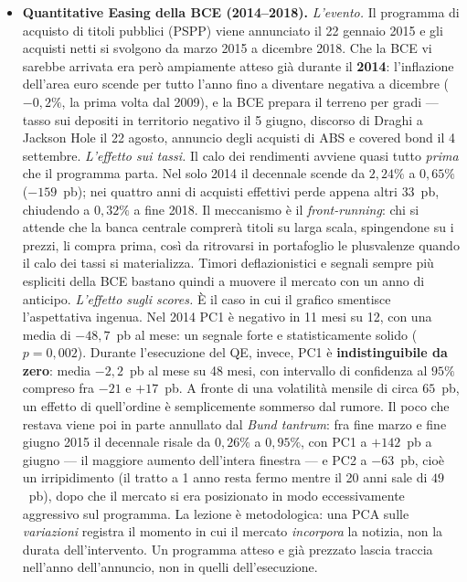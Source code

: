 \documentclass[11pt,a4paper]{article}
\theoremstyle{plain}
\theoremstyle{definition}
\theoremstyle{remark}
\begin{document}
\begin{itemize}
  \item \textbf{Quantitative Easing della BCE (2014--2018).}
        \emph{L'evento.} Il programma di acquisto di titoli pubblici (PSPP)
        viene annunciato il 22 gennaio 2015 e gli acquisti netti si svolgono
        da marzo 2015 a dicembre 2018. Che la BCE vi sarebbe arrivata era però
        ampiamente atteso già durante il \textbf{2014}: l'inflazione dell'area
        euro scende per tutto l'anno fino a diventare negativa a dicembre
        ($-0{,}2\%$, la prima volta dal 2009), e la BCE prepara il terreno per
        gradi --- tasso sui depositi in territorio negativo il 5 giugno,
        discorso di Draghi a Jackson Hole il 22 agosto, annuncio degli
        acquisti di ABS e covered bond il 4 settembre.
        \emph{L'effetto sui tassi.} Il calo dei rendimenti avviene quasi tutto
        \emph{prima} che il programma parta. Nel solo 2014 il decennale scende
        da $2{,}24\%$ a $0{,}65\%$ ($-159$~pb); nei quattro anni di acquisti
        effettivi perde appena altri $33$~pb, chiudendo a $0{,}32\%$ a fine
        2018. Il meccanismo è il \emph{front-running}: chi si attende che la
        banca centrale comprerà titoli su larga scala, spingendone su i
        prezzi, li compra prima, così da ritrovarsi in portafoglio le
        plusvalenze quando il calo dei tassi si materializza. Timori
        deflazionistici e segnali sempre più espliciti della BCE bastano
        quindi a muovere il mercato con un anno di anticipo.
        \emph{L'effetto sugli scores.} È il caso in cui il grafico smentisce
        l'aspettativa ingenua. Nel 2014 PC1 è negativo in 11 mesi su 12, con
        una media di $-48{,}7$~pb al mese: un segnale forte e statisticamente
        solido ($p = 0{,}002$). Durante l'esecuzione del QE, invece, PC1 è
        \textbf{indistinguibile da zero}: media $-2{,}2$~pb al mese su 48
        mesi, con intervallo di confidenza al $95\%$ compreso fra $-21$ e
        $+17$~pb. A fronte di una volatilità mensile di circa $65$~pb, un
        effetto di quell'ordine è semplicemente sommerso dal rumore.
        Il poco che restava viene poi in parte annullato dal \emph{Bund
        tantrum}: fra fine marzo e fine giugno 2015 il decennale risale da
        $0{,}26\%$ a $0{,}95\%$, con PC1 a $+142$~pb a giugno --- il maggiore
        aumento dell'intera finestra --- e PC2 a $-63$~pb, cioè un
        irripidimento (il tratto a 1 anno resta fermo mentre il 20 anni sale
        di $49$~pb), dopo che il mercato si era posizionato in modo
        eccessivamente aggressivo sul programma. La lezione è metodologica:
        una PCA sulle \emph{variazioni} registra il momento in cui il mercato
        \emph{incorpora} la notizia, non la durata dell'intervento. Un
        programma atteso e già prezzato lascia traccia nell'anno
        dell'annuncio, non in quelli dell'esecuzione.


\end{itemize}
\end{document}
